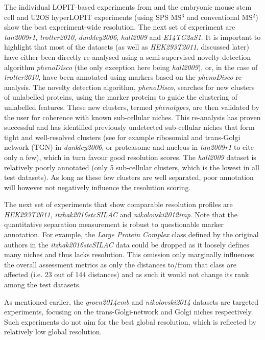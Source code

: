 \documentclass[12pt]{article}\usepackage[]{graphicx}\usepackage[]{color}
\begin{document}
The individual LOPIT-based experiments from \citet{JeanBeltran:2016}
and the embryonic mouse stem cell \citep{Christoforou:2016} and U2OS
\citep{Thul:2017} hyperLOPIT experiments (using SPS MS$^3$ and
conventional MS$^2$) show the best experiment-wide resolution. The
next set of experiment are \textit{tan2009r1}, \textit{trotter2010},
\textit{dunkley2006}, \textit{hall2009} and \textit{E14TG2aS1}. It is
important to highlight that most of the datasets (as well as
\textit{HEK293T2011}, discussed later) have either been directly
re-analysed using a semi-supervised novelty detection algorithm
\textit{phenoDisco} \citep{Breckels:2013} (the only exception here
being \textit{hall2009}), or, in the case of \textit{trotter2010},
have been annotated using markers based on the \textit{phenoDisco}
re-analysis. The novelty detection algorithm, \textit{phenoDisco},
searches for new clusters of unlabelled proteins, using the marker
proteins to guide the clustering of unlabelled features. These new
clusters, termed \textit{phenotypes}, are then validated by the user
for coherence with known sub-cellular niches.  This re-analysis has
proven successful \citep{Breckels:2013} and has identified previously
undetected sub-cellular niches that form tight and well-resolved
clusters (see for example ribosomial and trans-Golgi network (TGN) in
\textit{dunkley2006}, or proteasome and nucleus in \textit{tan2009r1}
to cite only a few), which in turn favour good resolution scores. The
\textit{hall2009} dataset is relatively poorly annotated (only 5
sub-cellular clusters, which is the lowest in all test datasets). As
long as these few clusters are well separated, poor annotation will
however not negatively influence the resolution scoring.



The next set of experiments that show comparable resolution profiles
are \textit{HEK293T2011}, \textit{itzhak2016stcSILAC} and
\textit{nikolovski2012imp}. Note that the quantitative separation
measurement is robust to questionable marker annotation. For example,
the \textit{Large Protein Complex} class defined by the original
authors in the \textit{itzhak2016stcSILAC} data could be dropped as it
loosely defines many niches and thus lacks resolution. This omission only
marginally influences the overall assessment metrics as only the
distances to/from that class are affected (i.e. 23
out of 144 distances) and as such it would not change its
rank among the test datasets.

As mentioned earlier, the \textit{groen2014cmb} and
\textit{nikolovski2014} datasets are targeted experiments, focusing on
the trans-Golgi-network and Golgi niches respectively. Such
experiments do not aim for the best global resolution, which is
reflected by relatively low global resolution.
\end{document}
